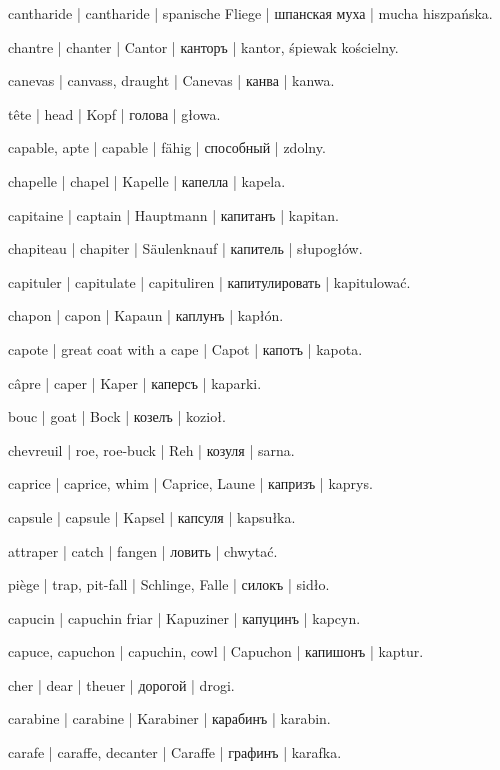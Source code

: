 \begin{outdent}{1em}
cantharide | cantharide | spanische Fliege | шпанская муха | mucha hiszpańska.

chantre | chanter | Cantor | канторъ | kantor, śpiewak kościelny.

canevas | canvass, draught | Canevas | канва | kanwa.

tête | head | Kopf | голова | głowa.

capable, apte | capable | fähig | способный | zdolny.

chapelle | chapel | Kapelle | капелла | kapela.

capitaine | captain | Hauptmann | капитанъ | kapitan.

chapiteau | chapiter | Säulenknauf | капитель | słupogłów.

capituler | capitulate | capituliren | капитулировать | kapitulować.

chapon | capon | Kapaun | каплунъ | kapłón.

capote | great coat with a cape | Capot | капотъ | kapota.

câpre | caper | Kaper | каперсъ | kaparki.

bouc | goat | Bock | козелъ | kozioł.

chevreuil | roe, roe-buck | Reh | козуля | sarna.

caprice | caprice, whim | Caprice, Laune | капризъ | kaprys.

capsule | capsule | Kapsel | капсуля | kapsułka.

attraper | catch | fangen | ловить | chwytać.

\uvsubentry{}
piège | trap, pit-fall | Schlinge, Falle | силокъ | sidło.

capucin | capuchin friar | Kapuziner | капуцинъ | kapcyn.

capuce, capuchon | capuchin, cowl | Capuchon | капишонъ | kaptur.

cher | dear | theuer | дорогой | drogi.

carabine | carabine | Karabiner | карабинъ | karabin.

carafe | caraffe, decanter | Caraffe | графинъ | karafka.


\end{outdent}
